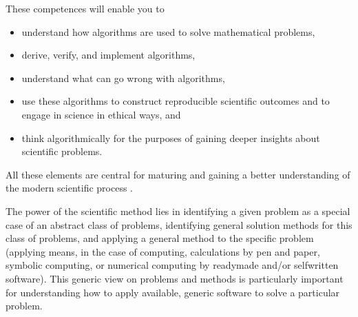 \documentclass[letterpaper,10pt,english]{sphinxmanual}
\begin{document}
These competences will enable you to
\begin{itemize}
\item {} 
understand how algorithms are used to solve mathematical problems,

\item {} 
derive, verify, and implement algorithms,

\item {} 
understand what can go wrong with algorithms,

\item {} 
use these algorithms to construct reproducible scientific outcomes and to engage in science in ethical ways, and

\item {} 
think algorithmically for the purposes of gaining deeper insights about scientific problems.

\end{itemize}

All these elements are central for maturing and gaining a better understanding of the modern scientific process .

The power of the scientific method lies in identifying a given problem
as a special case of an abstract class of problems, identifying
general solution methods for this class of problems, and applying a
general method to the specific problem (applying means, in the case of
computing, calculations by pen and paper, symbolic computing, or
numerical computing by ready\sphinxhyphen{}made and/or self\sphinxhyphen{}written software). This
generic view on problems and methods is particularly important for
understanding how to apply available, generic software to solve a
particular problem.

\end{document}
